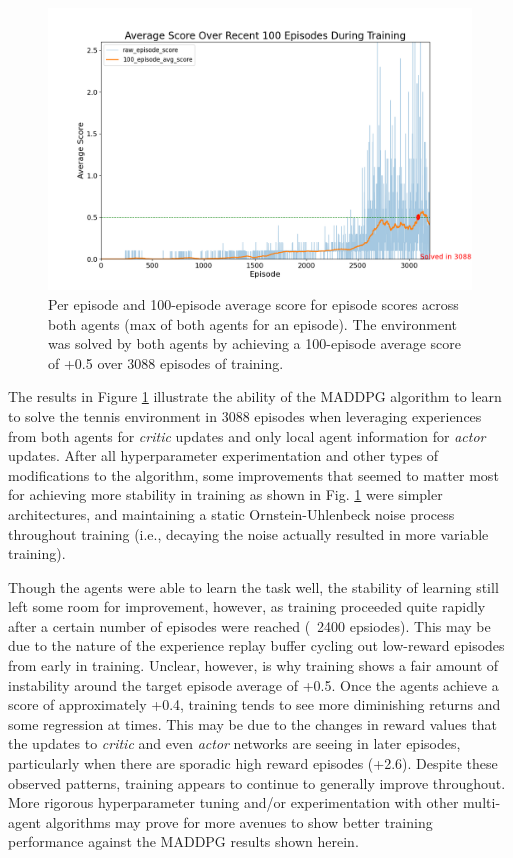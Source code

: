 \documentclass[11pt]{article}
\begin{document}
	\begin{figure}[!ht]
		\centering
		\includegraphics[width=0.75\linewidth]{images/training.png}
		\caption{Per episode and 100-episode average score for episode scores across both agents (max of both agents for an episode). The environment was solved by both agents by achieving a 100-episode average score of +0.5 over 3088 episodes of training.}
		\label{fig:maddpg-results}
	\end{figure}
	
	\FloatBarrier
	
	The results in Figure \ref{fig:maddpg-results} illustrate the ability of the MADDPG algorithm to learn to solve the tennis environment in 3088 episodes when leveraging experiences from both agents for \textit{critic} updates and only local agent information for \textit{actor} updates. After all hyperparameter experimentation and other types of modifications to the algorithm, some improvements that seemed to matter most for achieving more stability in training as shown in Fig. \ref{fig:maddpg-results} were simpler architectures, and maintaining a static Ornstein-Uhlenbeck noise process throughout training (i.e., decaying the noise actually resulted in more variable training).
		
	 Though the agents were able to learn the task well, the stability of learning still left some room for improvement, however, as training proceeded quite rapidly after a certain number of episodes were reached (~2400 epsiodes). This may be due to the nature of the experience replay buffer cycling out low-reward episodes from early in training. Unclear, however, is why training shows a fair amount of instability around the target episode average of +0.5. Once the agents achieve a score of approximately +0.4, training tends to see more diminishing returns and some regression at times. This may be due to the changes in reward values that the updates to \textit{critic} and even \textit{actor} networks are seeing in later episodes, particularly when there are sporadic high reward episodes (+2.6). Despite these observed patterns, training appears to continue to generally improve throughout. More rigorous hyperparameter tuning and/or experimentation with other multi-agent algorithms may prove for more avenues to show better training performance against the MADDPG results shown herein.
	
\end{document}
